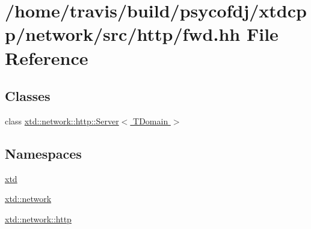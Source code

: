 \hypertarget{fwd_8hh}{\section{/home/travis/build/psycofdj/xtdcpp/network/src/http/fwd.hh File Reference}
\label{fwd_8hh}
}
\subsection*{Classes}
\begin{DoxyCompactItemize}
\item 
class \hyperlink{classxtd_1_1network_1_1http_1_1Server}{xtd\-::network\-::http\-::\-Server$<$ T\-Domain $>$}
\begin{DoxyCompactList}\small\item\em \par
\par
 \end{DoxyCompactList}\end{DoxyCompactItemize}
\subsection*{Namespaces}
\begin{DoxyCompactItemize}
\item 
\hyperlink{namespacextd}{xtd}
\item 
\hyperlink{namespacextd_1_1network}{xtd\-::network}
\item 
\hyperlink{namespacextd_1_1network_1_1http}{xtd\-::network\-::http}
\end{DoxyCompactItemize}
